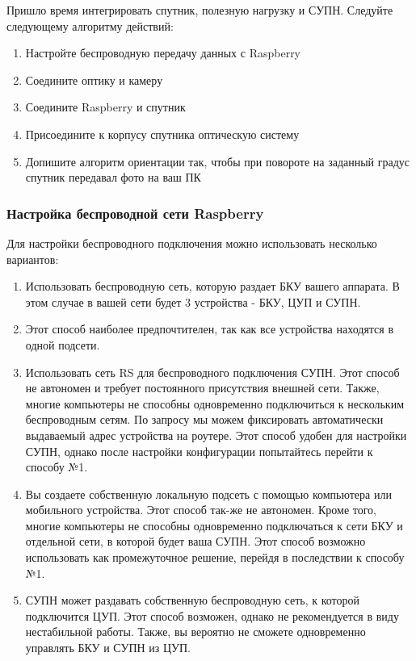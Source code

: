 Пришло время интегрировать спутник, полезную нагрузку и СУПН. Следуйте следующему алгоритму действий:

\begin{enumerate}
    \item Настройте беспроводную передачу данных с Raspberry
    \item Соедините оптику и камеру
    \item Соедините Raspberry и спутник
    \item Присоедините к корпусу спутника оптическую систему
    \item Допишите алгоритм ориентации так, чтобы при повороте на заданный градус спутник передавал фото на ваш ПК
\end{enumerate}

\subsubsection*{Настройка беспроводной сети Raspberry}

Для настройки беспроводного подключения можно использовать несколько вариантов:

\begin{enumerate}
    \item Использовать беспроводную сеть, которую раздает БКУ вашего аппарата. В этом случае в вашей сети будет 3 устройства - БКУ, ЦУП и СУПН.
    \item Этот способ наиболее предпочтителен, так как все устройства находятся в одной подсети.
    \item Использовать сеть RS для беспроводного подключения СУПН. Этот способ не автономен и требует постоянного присутствия внешней сети. Также, многие компьютеры не способны одновременно подключиться к нескольким беспроводным сетям. По запросу мы можем фиксировать автоматически выдаваемый адрес устройства на роутере. Этот способ удобен для настройки СУПН, однако после настройки конфигурации попытайтесь перейти к способу №1.
    \item Вы создаете собственную локальную подсеть с помощью компьютера или мобильного устройства. Этот способ так-же не автономен. Кроме того, многие компьютеры не способны одновременно подключаться к сети БКУ и отдельной сети, в которой будет ваша  СУПН. Этот способ возможно использовать как промежуточное решение, перейдя в последствии к способу №1.
    \item СУПН может раздавать собственную беспроводную сеть, к которой подключится ЦУП. Этот способ возможен, однако не рекомендуется в виду нестабильной работы. Также, вы вероятно не сможете одновременно управлять БКУ и СУПН из ЦУП.
\end{enumerate}


